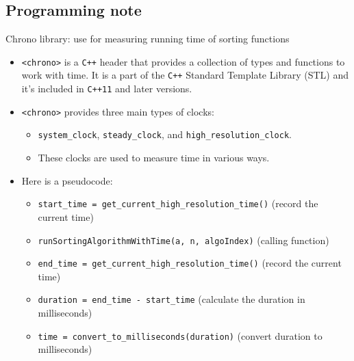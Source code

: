 \subsection{Programming note}
Chrono library: use for measuring running time of sorting functions
\begin{itemize}[label=-]
    \item \texttt{<chrono>} is a \texttt{C++} header that provides a collection of types and functions to work with time. It is a part of the \texttt{C++} Standard Template Library (STL) and it’s included in \texttt{C++11} and later versions. ~\cite{ref13}
    \item \texttt{<chrono>} provides three main types of clocks: 
        \begin{itemize}[label=$\bullet$]
            \item \texttt{system\_clock}, \texttt{steady\_clock}, and \texttt{high\_resolution\_clock}. 
            
            \item These clocks are used to measure time in various ways. ~\cite{ref13}
        \end{itemize}
    \item Here is a pseudocode:
        \begin{itemize}[label=$\bullet$]
            \item \texttt{start\_time = get\_current\_high\_resolution\_time()} (record the current time)
            
            \item \texttt{runSortingAlgorithmWithTime(a, n, algoIndex)} (calling function)
            
            \item \texttt{end\_time = get\_current\_high\_resolution\_time()} (record the current time)
            
            \item \texttt{duration = end\_time - start\_time} (calculate the duration in milliseconds)
            
            \item \texttt{time = convert\_to\_milliseconds(duration)} (convert duration to milliseconds)
        \end{itemize}
\end{itemize}
